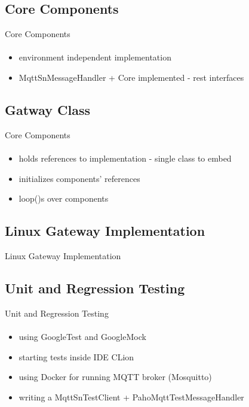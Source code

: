 \documentclass[10pt,aspectratio=\ratio,
compress
]{beamer}
\begin{document}
\subsection{Core Components}
\begin{frame}{Core Components}\framesubtitle{}
			\begin{itemize}
				\item environment independent implementation
				\item MqttSnMessageHandler + Core implemented - rest interfaces
			\end{itemize}
\end{frame}

\subsection{Gatway Class}
\begin{frame}{Core Components}\framesubtitle{}
	\begin{itemize}
		\item holds references to implementation - single class to embed
		\item initializes components' references
		\item loop()s over components
	\end{itemize}
\end{frame}


\subsection{Linux Gateway Implementation}
\begin{frame}{Linux Gateway Implementation}\framesubtitle{}
\end{frame}

\subsection{Unit and Regression Testing}
\begin{frame}{Unit and Regression Testing}\framesubtitle{}
	\begin{itemize}
		\item using GoogleTest and GoogleMock
		\item starting tests inside IDE CLion
		\item using Docker for running MQTT broker (Mosquitto)
		\item writing a MqttSnTestClient + PahoMqttTestMessageHandler
	\end{itemize}
\end{frame}
\end{document}
